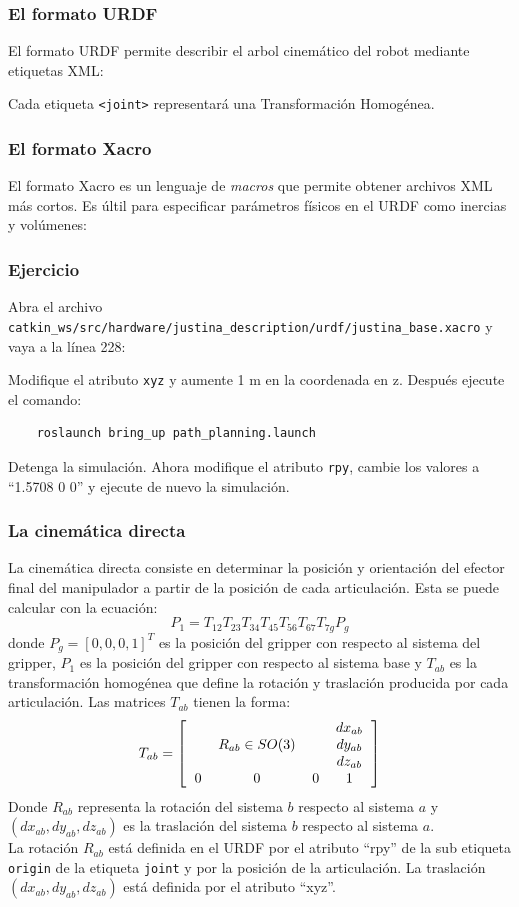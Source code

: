 \begin{frame}[containsverbatim]\frametitle{El formato URDF}
  El formato URDF permite describir el arbol cinemático del robot mediante etiquetas XML:
  \footnotesize
  
  \normalsize
  Cada etiqueta \texttt{<joint>} representará una Transformación Homogénea. 
\end{frame}

\begin{frame}[containsverbatim]\frametitle{El formato Xacro}
  El formato Xacro es un lenguaje de \textit{macros} que permite obtener archivos XML más cortos. Es últil para especificar parámetros físicos en el URDF como inercias y volúmenes:
  \footnotesize
  
\end{frame}

\begin{frame}[containsverbatim]\frametitle{Ejercicio}
  Abra el archivo \texttt{catkin\_ws/src/hardware/justina\_description/urdf/justina\_base.xacro} y vaya a la línea 228:
  
  Modifique el atributo \texttt{xyz} y aumente 1 m en la coordenada en z. Después ejecute el comando:
  \begin{lstlisting}
    roslaunch bring_up path_planning.launch
  \end{lstlisting}
  Detenga la simulación. Ahora modifique el atributo \texttt{rpy}, cambie los valores a ``1.5708 0 0'' y ejecute de nuevo la simulación. 
\end{frame}

\begin{frame}\frametitle{La cinemática directa}
  La cinemática directa consiste en determinar la posición y orientación del efector final del manipulador a partir de la posición de cada articulación.  Esta se puede calcular con la ecuación:
  \[P_1 = T_{12}T_{23}T_{34}T_{45}T_{56}T_{67}T_{7g}P_g\]
  donde $P_g = [0,0,0,1]^T$ es la posición del gripper con respecto al sistema del gripper, $P_1$ es la posición del gripper con respecto al sistema base y $T_{ab}$ es la transformación homogénea que define la rotación y traslación producida por cada articulación. Las matrices $T_{ab}$
  tienen la forma:
  \[T_{ab} = \left[\begin{tabular}{cccc}
      & & & $dx_{ab}$\\
      & $R_{ab}\in SO(3)$ & & $dy_{ab}$\\
      & & & $dz_{ab}$\\
      0 & 0& 0 & 1
    \end{tabular}\right]\]
  Donde $R_{ab}$ representa la rotación del sistema $b$ respecto al sistema $a$ y $(dx_{ab}, dy_{ab}, dz_{ab})$ es la traslación del sistema $b$ respecto al sistema $a$.\\
  La rotación $R_{ab}$ está definida en el URDF por el atributo ``rpy'' de la sub etiqueta \texttt{origin} de la etiqueta \texttt{joint} y por la posición de la articulación. La traslación $(dx_{ab}, dy_{ab}, dz_{ab})$ está definida por el atributo ``xyz''. 
\end{frame}


